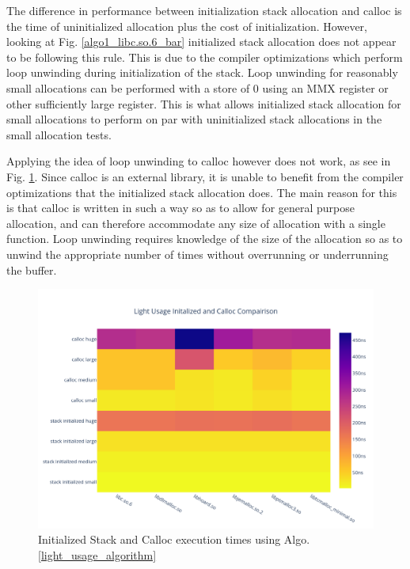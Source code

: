 \documentclass[letterpaper, 10 pt, conference]{ieeeconf}  %
\begin{document}
The difference in performance between initialization stack allocation and calloc is the time of uninitialized allocation plus the cost of initialization.
However, looking at Fig. \ref{algo1_libc.so.6_bar} initialized stack allocation does not appear to be following this rule.
This is due to the compiler optimizations which perform loop unwinding during initialization of the stack.
Loop unwinding for reasonably small allocations can be performed with a store of $0$ using an MMX register or other sufficiently large register.
This is what allows initialized stack allocation for small allocations to perform on par with uninitialized stack allocations in the small allocation tests.

Applying the idea of loop unwinding to calloc however does not work, as see in Fig. \ref{algo1_init_calloc_hist}.
Since calloc is an external library, it is unable to benefit from the compiler optimizations that the initialized stack allocation does.
The main reason for this is that calloc is written in such a way so as to allow for general purpose allocation, and can therefore accommodate any size of allocation with a single function.
Loop unwinding requires knowledge of the size of the allocation so as to unwind the appropriate number of times without overrunning or underrunning the buffer. 
\begin{figure}[tbh!]
  \centering
  \includegraphics[width=\columnwidth]{graphs/light_init_calloc_hist.png}
  \caption{ Initialized Stack and Calloc execution times using Algo. \ref{light_usage_algorithm} }
  \label{algo1_init_calloc_hist}
\end{figure} 
\end{document}
